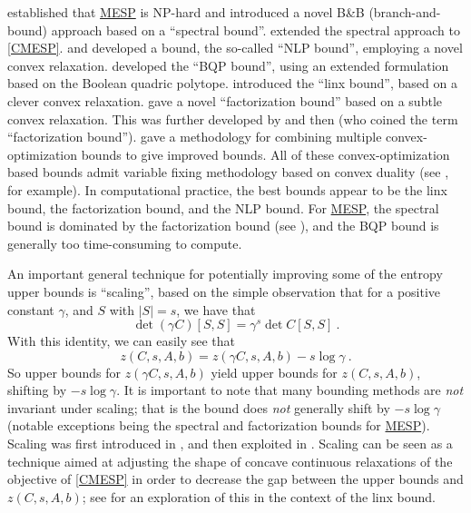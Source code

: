 \documentclass[smallextended]{svjour3hack}       %
\newcommand{\zc}[1]{\noindent{\color{red}[Zhongzhu:]\ {#1}}}
\begin{document}
\cite{KLQ} established that \hyperlink{MESP}{MESP} is NP-hard
and introduced a novel B\&B (branch-and-bound) approach
based on a ``spectral bound''. \cite{LeeConstrained}
extended the spectral approach to \ref{CMESP}.
\cite{AFLW_IPCO}  and \cite{AFLW_Using}
developed a bound, the so-called ``NLP bound'', employing a novel convex relaxation.
\cite{Anstreicher_BQP_entropy} developed the  ``BQP bound'', using an extended formulation based on the Boolean quadric polytope. \cite{Kurt_linx} introduced the ``linx bound'', based on a clever convex relaxation.
\cite{nikolov2015randomized} gave a novel
 ``factorization bound'' based on a subtle convex
 relaxation. This was further developed by \cite{li2020best} and then \cite{chen2023computing} (who coined the term ``factorization bound'').
  \cite{chen_mixing} gave a methodology for combining multiple
 convex-optimization bounds to give improved bounds.
 All of these convex-optimization based bounds admit variable
 fixing methodology based on convex duality (see \cite{FLbook}, for example).
In computational  practice, the best bounds appear to be the linx bound, the factorization bound, and the NLP bound.
For \hyperlink{MESP}{MESP}, the spectral bound  is dominated by the factorization bound (see \cite{chen2023computing}), and the
BQP bound is generally too time-consuming to compute.

An important general technique for potentially improving some of the
entropy upper bounds is ``scaling'',
based on the simple observation that
for a positive constant $\gamma$, and $S$
with $|S|=s$, we have that
\[
\det (\gamma C)[S,S] = \gamma^s \det C[S,S]~.
\]
With this identity,  we can easily see that
\[
z(C,s, A, b) = z(\gamma C,s, A, b) -s \log \gamma~.
\]
So upper bounds for $z(\gamma C,s, A, b)$
 yield upper bounds for $z(C,s, A, b)$,
shifting by $-s \log \gamma$.
It is important to note that many bounding methods are \emph{not} invariant under
scaling; that is the bound does \emph{not} generally  shift by $-s\log \gamma$ (notable exceptions being the spectral and factorization bounds for \hyperlink{MESP}{MESP}).
Scaling was first introduced in \cite{AFLW_IPCO,AFLW_Using}, and then exploited in \cite{Anstreicher_BQP_entropy,Kurt_linx,Al-ThaniLee1,chen_mixing,chen2022masking,chen2023computing}. Scaling can be seen as a technique aimed at adjusting the shape of  concave continuous relaxations of the objective of \ref{CMESP} in order to decrease the gap between the upper bounds and $z(C,s, A, b)$; see \cite{chen2022masking} for an exploration of this in the context of the linx bound.
\end{document}
